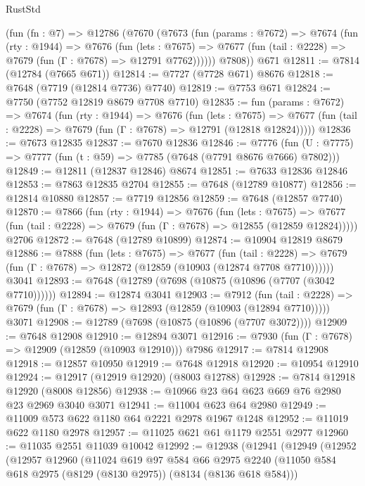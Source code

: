 \begin{lexlean}{RustStd}
\begin{coremodule}
    (fun (fn : @7) =>
    @12786
      (@7670
        (@7673
          (fun (params : @7672) =>
          @7674
            (fun (rty : @1944) =>
            @7676
              (fun (lets : @7675) =>
              @7677 (fun (tail : @2228) => @7679 (fun (Γ : @7678) => @12791 @7762))))))
        @7808))
    @671
@12811 := @7814 (@12784 (@7665 @671))
@12814 := @7727 (@7728 @671) @8676
@12818 := @7648 (@7719 (@12814 @7736) @7740)
@12819 := @7753 @671
@12824 := @7750 (@7752 @12819 @8679 @7708 @7710)
@12835 := fun (params : @7672) =>
  @7674
    (fun (rty : @1944) =>
    @7676
      (fun (lets : @7675) =>
      @7677 (fun (tail : @2228) => @7679 (fun (Γ : @7678) => @12791 (@12818 @12824)))))
@12836 := @7673 @12835
@12837 := @7670 @12836
@12846 := @7776
    (fun (U : @7775) => @7777 (fun (t : @59) => @7785 (@7648 (@7791 @8676 @7666) @7802)))
@12849 := @12811 (@12837 @12846) @8674
@12851 := @7633 @12836 @12846
@12853 := @7863 @12835 @2704
@12855 := @7648 (@12789 @10877)
@12856 := @12814 @10880
@12857 := @7719 @12856
@12859 := @7648 (@12857 @7740)
@12870 := @7866
    (fun (rty : @1944) =>
    @7676
      (fun (lets : @7675) =>
      @7677 (fun (tail : @2228) => @7679 (fun (Γ : @7678) => @12855 (@12859 @12824)))))
    @2706
@12872 := @7648 (@12789 @10899)
@12874 := @10904 @12819 @8679
@12886 := @7888
    (fun (lets : @7675) =>
    @7677
      (fun (tail : @2228) =>
      @7679 (fun (Γ : @7678) => @12872 (@12859 (@10903 (@12874 @7708 @7710))))))
    @3041
@12893 := @7648 (@12789 (@7698 (@10875 (@10896 (@7707 (@3042 @7710))))))
@12894 := @12874 @3041
@12903 := @7912
    (fun (tail : @2228) => @7679 (fun (Γ : @7678) => @12893 (@12859 (@10903 (@12894 @7710)))))
    @3071
@12908 := @12789 (@7698 (@10875 (@10896 (@7707 @3072))))
@12909 := @7648 @12908
@12910 := @12894 @3071
@12916 := @7930 (fun (Γ : @7678) => @12909 (@12859 (@10903 @12910))) @7986
@12917 := @7814 @12908
@12918 := @12857 @10950
@12919 := @7648 @12918
@12920 := @10954 @12910
@12924 := @12917 (@12919 @12920) (@8003 @12788)
@12928 := @7814 @12918 @12920 (@8008 @12856)
@12938 := @10966 @23 @64 @623 @669 @76 @2980 @23 @2969 @3040 @3071
@12941 := @11004 @623 @64 @2980
@12949 := @11009 @573 @622 @1180 @64 @2221 @2978 @1967 @1248
@12952 := @11019 @622 @1180 @2978
@12957 := @11025 @621 @61 @1179 @2551 @2977
@12960 := @11035 @2551 @11039 @10042
@12992 := @12938
    (@12941
      (@12949
        (@12952
          (@12957
            @12960
            (@11024
              @619
              @97
              @584
              @66
              @2975
              @2240
              (@11050 @584 @618 @2975 (@8129 (@8130 @2975)) (@8134 (@8136 @618 @584)))

\end{coremodule}
\end{lexlean}

